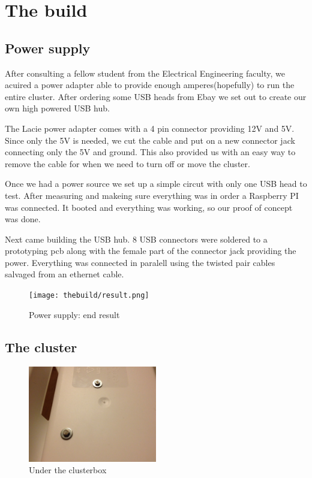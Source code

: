 \clearpage
\section{The build}
\subsection{Power supply}
After consulting a fellow student from the Electrical Engineering faculty, we acuired a power adapter able to provide enough amperes(hopefully) to run the entire cluster. After ordering some USB heads from Ebay we set out to create our own high powered USB hub. 

The Lacie power adapter comes with a 4 pin connector providing 12V and 5V. Since only the 5V is needed, we cut the cable and put on a new connector jack connecting only the 5V and ground. This also provided us with an easy way to remove the cable for when we need to turn off or move the cluster. 

Once we had a power source we set up a simple circut with only one USB head to test. After measuring and makeing sure everything was in order a Raspberry PI was connected. It booted and everything was working, so our proof of concept was done.  

Next came building the USB hub. 8 USB connectors were soldered to a prototyping pcb along with the female part of the connector jack providing the power. Everything was connected in paralell using the twisted pair cables salvaged from an ethernet cable.  

\begin{figure}[h]
	\centering
    \texttt{[image: thebuild/result.png]}
    \caption{Power supply: end result}
    \label{fig:build_power_supply}
\end{figure}

\subsection{The cluster}

\begin{figure}[h]
	\centering
    \includegraphics[width=0.5\textwidth]{thebuild/cluster_under.jpg}
    \caption{Under the clusterbox}
    \label{fig:build_cluster_under}
\end{figure}

